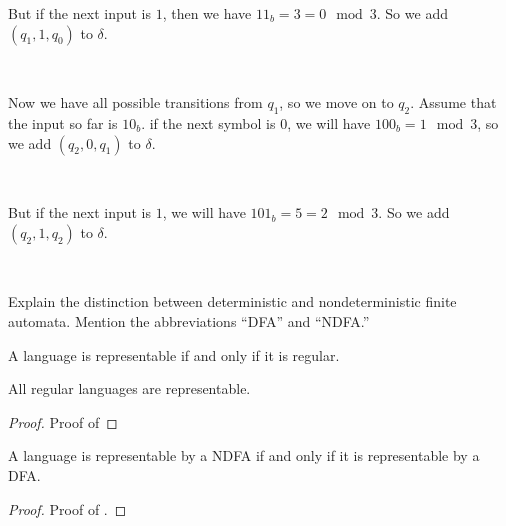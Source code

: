 \documentclass{bcthesis}
\newenvironment{exstep}[1]
		{
			\begin{minipage}{0.5 \textwidth}
				#1
			\end{minipage} \begin{minipage}{0.5 \paperwidth}
		}
		{
			\end{minipage}\\[0.5 em]
		}
\begin{document}
\begin{example}
		\begin{exstep}
			{
				But if the next input is $1$, then we have $11_b = 3 = 0 \mod 3$.
				So we add $(q_1, 1, q_0)$ to $\delta$.
			}
			
		\end{exstep}
		

		\begin{exstep}
			{
			Now we have all possible transitions from $q_1$, so we move on to $q_2$.
			Assume that the input so far is $10_b$.
			if the next symbol is $0$, we will have $100_b = 1 \mod 3$, so we add $(q_2, 0, q_1)$ to $\delta$.
			}
			
		\end{exstep}
		
		\begin{exstep}
			{
				But if the next input is $1$, we will have $101_b = 5 = 2 \mod 3$.
				So we add $(q_2, 1, q_2)$ to $\delta$.
			}
			
		\end{exstep}
	\end{example}

	\begin{definition}
		Explain the distinction between deterministic and nondeterministic finite automata.
		Mention the abbreviations ``DFA'' and ``NDFA.''
	\end{definition}


\label{ch:kleenes_theorem}

	\begin{theorem}
		A language is representable if and only if it is regular.
	\end{theorem}

	\begin{claim}
	\label{prop:regular_languages_representable}
		All regular languages are representable.
	\end{claim}

	\begin{proof}
		Proof of 
	\end{proof}

	\begin{claim}
	\label{prop:ndfa_dfa_equivalent}
		A language is representable by a NDFA if and only if it is representable by a DFA.
	\end{claim}

	\begin{proof}
	\label{proof:ndfa_dfa_equivalent}
		Proof of .
	\end{proof}
\end{document}

